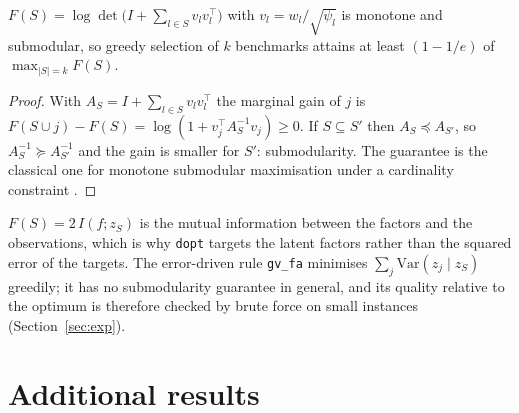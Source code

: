 \begin{proposition}\label{prop:greedy}
$F(S)=\log\det\big(I+\sum_{l\in S}v_lv_l^\top\big)$ with $v_l=w_l/\sqrt{\psi_l}$ is monotone and submodular, so greedy selection of $k$ benchmarks attains at least $(1-1/e)$ of $\max_{|S|=k}F(S)$.
\end{proposition}
\begin{proof}
With $A_S=I+\sum_{l\in S}v_lv_l^\top$ the marginal gain of $j$ is $F(S\cup j)-F(S)=\log(1+v_j^\top A_S^{-1}v_j)\ge0$. If $S\subseteq S'$ then $A_S\preceq A_{S'}$, so $A_S^{-1}\succeq A_{S'}^{-1}$ and the gain is smaller for $S'$: submodularity. The guarantee is the classical one for monotone submodular maximisation under a cardinality constraint \citep{nemhauser1978analysis}.
\end{proof}
$F(S)=2\,I(f;z_S)$ is the mutual information between the factors and the observations, which is why \texttt{dopt} targets the latent factors rather than the squared error of the targets. The error-driven rule \texttt{gv\_fa} minimises $\sum_j\mathrm{Var}(z_j\mid z_S)$ greedily; it has no submodularity guarantee in general, and its quality relative to the optimum is therefore checked by brute force on small instances (Section~\ref{sec:exp}).

\section{Additional results}
\label{app:extra}

